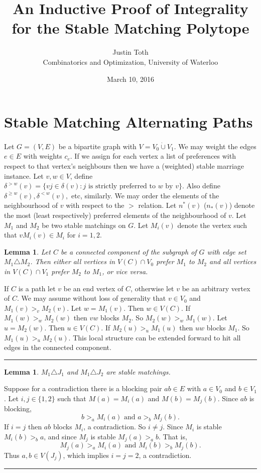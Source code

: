 \documentclass[letterpaper,12pt,oneside,onecolumn]{article}
\title{An Inductive Proof of Integrality for the Stable Matching Polytope}
\date{March 10, 2016}
\author{Justin Toth\\ Combinatorics and Optimization, University of Waterloo}
\newtheorem{lemma}[fact]{Lemma}
\newenvironment{proof}{{\bf Proof:  }}{\hfill\rule{2mm}{2mm}}
\begin{document}
\maketitle
\section{Stable Matching Alternating Paths}
\paragraph{}
Let $G = (V, E)$ be a bipartite graph with $V = V_0 \dot\cup V_1$. We may weight the edges $e \in E$ with weights $c_e$. If we assign for each vertex a list of preferences with respect to that vertex's neighbours then we have a (weighted) stable marriage instance. Let $v,w \in V$, define $\delta^{>w}(v) = \{vj \in \delta(v): j \text{ is strictly preferred to } w \text{ by } v\}$. Also define $ \delta^{\geq w}(v), \delta^{<w}(v),$ etc, similarly. We may order the elements of the neighbourhood of $v$ with respect to the $>$ relation. Let $n^*(v)$ ($n_*(v)$) denote the most (least respectively) preferred elements of the neighbourhood of $v$.
 Let $M_1$ and $M_2$ be two stable matchings on $G$. Let $M_i(v)$ denote the vertex such that $vM_i(v) \in M_i$ for $i=1,2$.
\begin{lemma}
Let $C$ be a connected component of the subgraph of $G$ with edge set $M_1 \triangle M_2$. Then either all vertices in $V(C) \cap V_0$ prefer $M_1$ to $M_2$ and all vertices in $V(C) \cap V_1$ prefer $M_2$ to $M_1$, or vice versa.
\end{lemma}
\begin{proof}
If $C$ is a path let $v$ be an end vertex of $C$, otherwise let $v$ be an arbitrary vertex of $C$. We may assume without loss of generality that $v \in V_0$ and $M_1(v) >_v M_2(v)$. Let $w = M_1(v)$. Then $w \in V(C)$. If $M_1(w) >_w M_2(w)$ then $vw$ blocks $M_2$. So $M_2(w) >_w M_1(w)$. Let $u=M_2(w)$. Then $u \in V(C)$. If $M_2(u) >_u M_1(u)$ then $uw$ blocks $M_1$. So $M_1(u) >_u M_2(u)$. This local structure can be extended forward to hit all edges in the connected component.
\end{proof}

\begin{lemma}
$M_1 \triangle J_1$ and $M_1 \triangle J_2$ are stable matchings.
\end{lemma}
\begin{proof}
Suppose for a contradiction there is a blocking pair $ab \in E$ with $a \in V_0$ and $b \in V_1$. Let $i,j \in \{1,2\}$ such that $M(a) = M_i(a)$ and $M(b) = M_j(b)$. Since $ab$ is blocking,
$$b >_a M_i(a) \text{ and } a >_b M_j(b). $$
If $i=j$ then $ab$ blocks $M_i$, a contradiction. So $i \neq j$. Since $M_i$ is stable $M_i(b) >_b a$, and since $M_j$ is stable $M_j(a) >_a b$. That is,
$$M_j(a) >_a M_i(a) \text{ and } M_i(b) >_b M_j(b).$$
Thus $a,b \in V(J_j)$, which implies $i=j=2$, a contradiction.
\end{proof}
\end{document}
